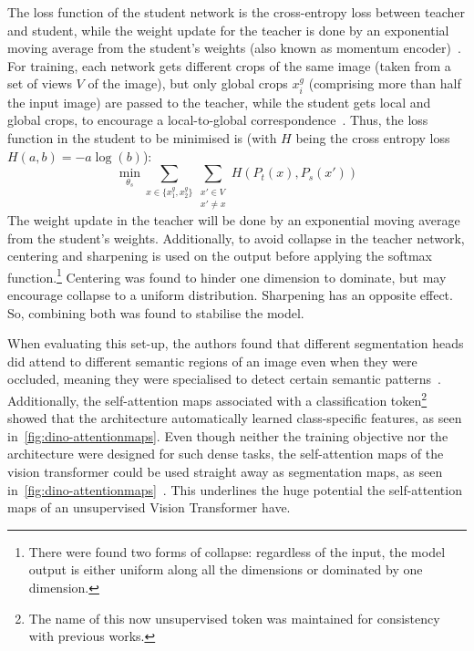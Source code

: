 The loss function of the student network is the cross-entropy loss between teacher and student, while the weight update for the teacher is done by an exponential moving average from the student's weights (also known as momentum encoder)~\autocite{Caron2021}.
For training, each network gets different crops of the same image (taken from a set of views $V$ of the image), but only global crops $x^g_i$ (comprising more than half the input image) are passed to the teacher, while the student gets local and global crops, to encourage a local-to-global correspondence~\autocite{Caron2021}.
Thus, the loss function in the student to be minimised is  (with $H$ being the cross entropy loss $H(a,b) = -a \log(b)$):
\begin{equation}
    \min_{\theta_s} \sum_{x \in \{x^g_1, x^g_2\}} \sum_{\substack{x' \in V \\ x' \neq x}} H(P_t(x), P_s(x'))
    \label{eq:loss-with-crops}
\end{equation}
The weight update in the teacher will be done by an exponential moving average from the student's weights.
Additionally, to avoid collapse in the teacher network, centering and sharpening is used on the output before applying the softmax function.\footnote{There were found two forms of collapse: regardless of the input, the model output is either uniform along all the dimensions or dominated by one dimension.}
Centering was found to hinder one dimension to dominate, but may encourage collapse to a uniform distribution.
Sharpening has an opposite effect.
So, combining both was found to stabilise the model.~\autocite{Caron2021}

When evaluating this set-up, the authors found that different segmentation heads did attend to different semantic regions of an image even when they were occluded, meaning they were specialised to detect certain semantic patterns~\autocite{Caron2021}.
Additionally, the self-attention maps associated with a classification token\footnote{The name of this now unsupervised token was maintained for consistency with previous works.} showed that the architecture automatically learned class-specific features, as seen in~\autoref{fig:dino-attentionmaps}.
Even though neither the training objective nor the architecture were designed for such dense tasks, the self-attention maps of the vision transformer could be used straight away as segmentation maps, as seen in~\autoref{fig:dino-attentionmaps}~\autocite{Caron2021}.
This underlines the huge potential the self-attention maps of an unsupervised Vision Transformer have.

